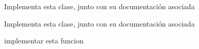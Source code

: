 
\begin{DoxyRefList}
\item[\label{todo__todo000003}%
\hypertarget{todo__todo000003}{}%
Clase \hyperlink{classconjunto}{conjunto} ]Implementa esta clase, junto con su documentación asociada  
\item[\label{todo__todo000002}%
\hypertarget{todo__todo000002}{}%
Clase \hyperlink{classcrimen}{crimen} ]Implementa esta clase, junto con su documentación asociada 
\item[\label{todo__todo000004}%
\hypertarget{todo__todo000004}{}%
global\+Scope$>$ Miembro \hyperlink{conjunto_8h_ae54b721035471d372f29c0335c42734a}{operator$<$$<$} (ostream \&sal, const conjunto \&D)]implementar esta funcion 
\end{DoxyRefList}